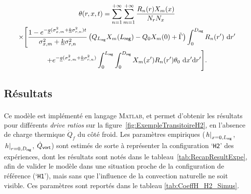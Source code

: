\begin{multline}
	\theta(r,x,t) = \sum_{n=1}^{+\infty}\sum_{m=1}^{+\infty}\frac{R_n(r)X_m(x)}{N_r N_x}\\
	\times \Bigg[ \frac{1-e^{-\underline{g}(\sigma_{x,m}^2+\underline{k}\sigma_{r,n}^2)t}}{\sigma_{x,m}^2+\underline{k}\sigma_{r,n}^2}\left(Q_{L_{\sf reg}}X_m(L_{\sf reg}) - Q_{0}X_m(0) + \tilde{\Gamma}\right) \int_{0}^{D_{\sf reg}} R_n(r')\ \deriv r' \\
	+ e^{-\underline{g}(\sigma_{x,m}^2+\underline{k}\sigma_{r,n}^2)} \int_{0}^{L_{\sf reg}}\int_{0}^{D_{\sf reg}}X_m(x')R_n(r')\theta_0\ \deriv x' \deriv r' \Bigg].
\end{multline}

%
%
%

\subsection{Résultats}
Ce modèle est implémenté en langage \textsc{Matlab}\textsuperscript{\textregistered}, et permet d'obtenir les résultats pour différents \textit{drive ratios} sur la figure~\ref{fig:ExempleTransitoireH2}, en l'absence de charge thermique $\dot Q_{f}$ du côté froid. Les paramètres empiriques ($\left.h\right|_{x=0,L_{\sf reg}}$, $\left.h\right|_{r=0,D_{\sf reg}}$, $\dot Q_{\sf vort}$) sont estimés de sorte à représenter la configuration `\texttt{H2}' des expériences, dont les résultats sont notés dans le tableau~\ref{tab:RecapResultExpe}, afin de valider le modèle dans une situation proche de la configuration de référence (`\texttt{H1}'), mais sans que l'influence de la convection naturelle ne soit visible. Ces paramètres sont reportés dans le tableau \ref{tab:CoeffH_H2_Simus}.\medskip

